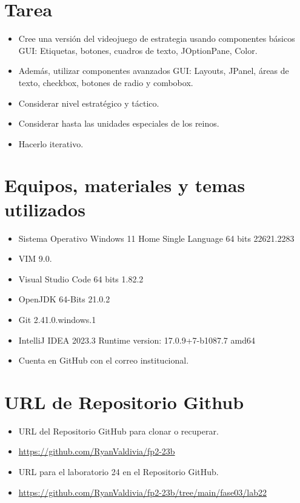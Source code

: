 \documentclass{article}
\begin{document}
	\section{Tarea}
	\begin{itemize}
			\item Cree una versión del videojuego de estrategia usando componentes básicos GUI: Etiquetas, botones,
cuadros de texto, JOptionPane, Color.
			\item Además, utilizar componentes avanzados GUI: Layouts, JPanel, áreas de texto, checkbox, botones de
radio y combobox.
			\item Considerar nivel estratégico y táctico.
			\item Considerar hasta las unidades especiales de los reinos.
			\item Hacerlo iterativo.
	\end{itemize}
		
	\section{Equipos, materiales y temas utilizados}
	\begin{itemize}
		\item Sistema Operativo Windows 11 Home Single Language 64 bits 22621.2283
		\item VIM 9.0.
		\item Visual Studio Code 64 bits 1.82.2
		\item OpenJDK 64-Bits 21.0.2
		\item Git 2.41.0.windows.1
		\item IntelliJ IDEA 2023.3 Runtime version: 17.0.9+7-b1087.7 amd64
		\item Cuenta en GitHub con el correo institucional. 
	\end{itemize}
	
	\section{URL de Repositorio Github}
	\begin{itemize}
		\item URL del Repositorio GitHub para clonar o recuperar.
		\item \url{https://github.com/RyanValdivia/fp2-23b}
		\item URL para el laboratorio 24 en el Repositorio GitHub.
		\item \url{https://github.com/RyanValdivia/fp2-23b/tree/main/fase03/lab22}
	\end{itemize}
\end{document}
